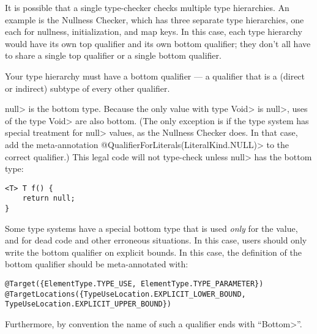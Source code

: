 It is possible that a single type-checker checks multiple type hierarchies.
An example is the Nullness Checker, which has three separate type
hierarchies, one each for
nullness, initialization, and map keys.  In this case, each type hierarchy
would have its own top qualifier and its own bottom qualifier; they don't
all have to share a single top qualifier or a single bottom qualifier.


Your type hierarchy must have a bottom qualifier
--- a qualifier that is a (direct or indirect) subtype of every other
qualifier.

\<null> is the bottom type. Because the only value with type \<Void> is
\<null>, uses of the type \<Void> are also bottom.
(The only exception
is if the type system has special treatment for \<null> values, as the
Nullness Checker does. In that case, add the meta-annotation \<@QualifierForLiterals(LiteralKind.NULL)>
to the correct qualifier.)
This legal code
will not type-check unless \<null> has the bottom type:
\begin{Verbatim}
<T> T f() {
    return null;
}
\end{Verbatim}


Some type systems have a special bottom type that is used \emph{only} for
the  value, and for dead code and other erroneous situations.
In this case, users should only write the bottom qualifier on explicit
bounds.  In this case, the definition of the bottom qualifier should be
meta-annotated with:

%
\begin{Verbatim}
@Target({ElementType.TYPE_USE, ElementType.TYPE_PARAMETER})
@TargetLocations({TypeUseLocation.EXPLICIT_LOWER_BOUND, TypeUseLocation.EXPLICIT_UPPER_BOUND})
\end{Verbatim}

Furthermore, by convention the name of such a qualifier ends with ``\<Bottom>''.

